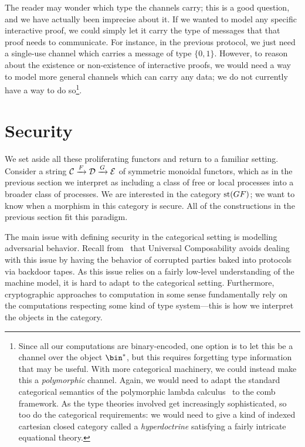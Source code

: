 The reader may wonder which type the channels carry; this is a good question,
and we have actually been imprecise about it. If we wanted to model any specific
interactive proof, we could simply let it carry the type of messages that that
proof needs to communicate. For instance, in the previous protocol, we just need
a single-use channel which carries a message of type $\{0, 1\}$.
However, to reason about the existence or non-existence of interactive proofs,
we would need a way to model more general channels which can carry any data; we
do not currently have a way to do so\footnote{
  Since all our computations are binary-encoded, one option is to let this be a
  channel over the object $\bin^*$, but this requires forgetting type information
  that may be useful. With more categorical machinery, we could instead make this
  a \emph{polymorphic} channel. Again, we would need to adapt the standard
  categorical semantics of the polymorphic lambda calculus~\cite{seely-1987} to
  the comb framework. As the type theories involved get increasingly
  sophisticated, so too do the categorical requirements: we would need to give a
  kind of indexed cartesian closed category called a \emph{hyperdoctrine}
  satisfying a fairly intricate equational theory.
}.

\section{Security}
\label{sec:security}

We set aside all these proliferating functors and return to a familiar setting.
Consider a string ${\mathcal{C}}\xrightarrow{F}{\mathcal{D}}\xrightarrow{G}{\mathcal{E}}$ of symmetric monoidal
functors, which as in the previous section we interpret as including a class of
free or local processes into a broader class of processes. We are interested in
the category $\operatorname*{st}(GF)$; we want to know when a morphism in this category is
secure. All of the constructions in the previous section fit this paradigm.

The main issue with defining security in the categorical setting is modelling
adversarial behavior. Recall from~
that Universal Composability avoids
dealing with this issue by having the behavior of corrupted parties baked into
protocols via backdoor tapes. As this issue relies on a fairly low-level
understanding of the machine model, it is hard to adapt to the categorical
setting. Furthermore, cryptographic approaches to computation in some sense
fundamentally rely on the computations respecting some kind of type
system---this is how we interpret the objects in the category.

